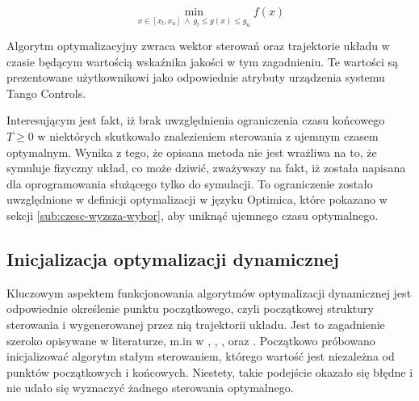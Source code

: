 \begin{equation}\label{eq:opt-stat}
    \min\limits_{x \in [x_{l}, x_{u}]~ \land~ g_{l} \leq g(x) \leq g_{u}} f(x)
\end{equation}

Algorytm optymalizacyjny zwraca wektor sterowań oraz trajektorie układu w czasie będącym wartością wskaźnika jakości w tym zagadnieniu. Te wartości są prezentowane użytkownikowi jako odpowiednie atrybuty urządzenia systemu Tango Controls.

Interesującym jest fakt, iż brak uwzględnienia ograniczenia czasu końcowego $T \geq 0$ w niektórych skutkowało znalezieniem sterowania z ujemnym czasem optymalnym. Wynika z tego, że opisana metoda nie jest wrażliwa na to, że symuluje fizyczny układ, co może dziwić, zważywszy na fakt, iż została napisana dla oprogramowania służącego tylko do symulacji.
To ograniczenie zostało uwzględnione w definicji optymalizacji w języku Optimica, które pokazano w sekcji \ref{sub:czesc-wyzsza-wybor}, aby uniknąć ujemnego czasu optymalnego.

\subsection{Inicjalizacja optymalizacji dynamicznej}
\label{sub:opt-init}

Kluczowym aspektem funkcjonowania algorytmów optymalizacji dynamicznej jest odpowiednie określenie punktu początkowego, czyli początkowej struktury sterowania i wygenerowanej przez nią trajektorii układu. Jest to zagadnienie szeroko opisywane w literaturze, m.in w \cite{Betts98}, \cite{Rao2010}, \cite{Korytowski2015}, \cite{cas+11ifac} oraz \cite{JModelicaUserGuide}.
Początkowo próbowano inicjalizować algorytm stałym sterowaniem, którego wartość jest niezależna od punktów początkowych i końcowych. Niestety, takie podejście okazało się błędne i nie udało się wyznaczyć żadnego sterowania optymalnego.

